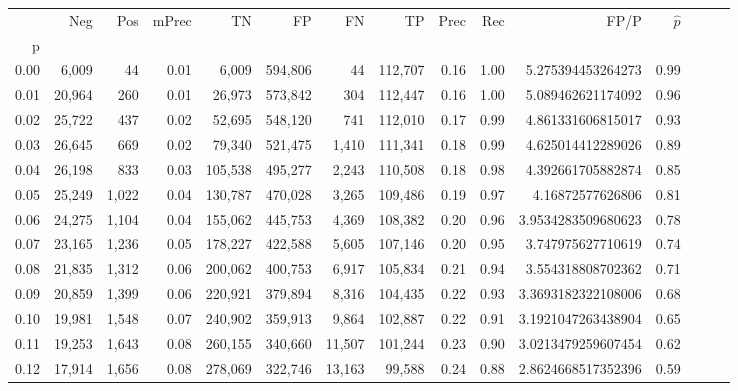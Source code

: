 \begin{tabular}{rrrrrrrrrrrrrrr}
\toprule
{} &     Neg &    Pos & mPrec &       TN &       FP &       FN &       TP &  Prec &   Rec &                   FP/P & $\hat{p}$ \\
p    &         &        &       &          &          &          &          &       &       &                        &           \\
\midrule
0.00 &   6,009 &     44 &  0.01 &    6,009 &  594,806 &       44 &  112,707 &  0.16 &  1.00 &      5.275394453264273 &      0.99 \\
0.01 &  20,964 &    260 &  0.01 &   26,973 &  573,842 &      304 &  112,447 &  0.16 &  1.00 &      5.089462621174092 &      0.96 \\
0.02 &  25,722 &    437 &  0.02 &   52,695 &  548,120 &      741 &  112,010 &  0.17 &  0.99 &      4.861331606815017 &      0.93 \\
0.03 &  26,645 &    669 &  0.02 &   79,340 &  521,475 &    1,410 &  111,341 &  0.18 &  0.99 &      4.625014412289026 &      0.89 \\
0.04 &  26,198 &    833 &  0.03 &  105,538 &  495,277 &    2,243 &  110,508 &  0.18 &  0.98 &      4.392661705882874 &      0.85 \\
0.05 &  25,249 &  1,022 &  0.04 &  130,787 &  470,028 &    3,265 &  109,486 &  0.19 &  0.97 &       4.16872577626806 &      0.81 \\
0.06 &  24,275 &  1,104 &  0.04 &  155,062 &  445,753 &    4,369 &  108,382 &  0.20 &  0.96 &     3.9534283509680623 &      0.78 \\
0.07 &  23,165 &  1,236 &  0.05 &  178,227 &  422,588 &    5,605 &  107,146 &  0.20 &  0.95 &      3.747975627710619 &      0.74 \\
0.08 &  21,835 &  1,312 &  0.06 &  200,062 &  400,753 &    6,917 &  105,834 &  0.21 &  0.94 &      3.554318808702362 &      0.71 \\
0.09 &  20,859 &  1,399 &  0.06 &  220,921 &  379,894 &    8,316 &  104,435 &  0.22 &  0.93 &     3.3693182322108006 &      0.68 \\
0.10 &  19,981 &  1,548 &  0.07 &  240,902 &  359,913 &    9,864 &  102,887 &  0.22 &  0.91 &     3.1921047263438904 &      0.65 \\
0.11 &  19,253 &  1,643 &  0.08 &  260,155 &  340,660 &   11,507 &  101,244 &  0.23 &  0.90 &     3.0213479259607454 &      0.62 \\
0.12 &  17,914 &  1,656 &  0.08 &  278,069 &  322,746 &   13,163 &   99,588 &  0.24 &  0.88 &     2.8624668517352396 &      0.59 \\

\end{tabular}
